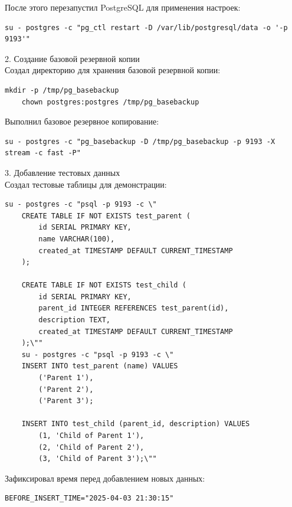 \documentclass{article}
\begin{document}
После этого перезапустил PostgreSQL для применения настроек:
\begin{lstlisting}[caption={kitty}, label={lst:example}]
    su - postgres -c "pg_ctl restart -D /var/lib/postgresql/data -o '-p 9193'"
\end{lstlisting}


2. Создание базовой резервной копии
\\
Создал директорию для хранения базовой резервной копии:

\begin{lstlisting}[caption={kitty}, label={lst:example}]
    mkdir -p /tmp/pg_basebackup
    chown postgres:postgres /tmp/pg_basebackup
\end{lstlisting}

Выполнил базовое резервное копирование:

\begin{lstlisting}[caption={kitty}, label={lst:example}]
    su - postgres -c "pg_basebackup -D /tmp/pg_basebackup -p 9193 -X stream -c fast -P"
\end{lstlisting}

3. Добавление тестовых данных
\\
Создал тестовые таблицы для демонстрации:

\begin{lstlisting}[caption={kitty}, label={lst:example}]
    su - postgres -c "psql -p 9193 -c \"
    CREATE TABLE IF NOT EXISTS test_parent (
        id SERIAL PRIMARY KEY,
        name VARCHAR(100),
        created_at TIMESTAMP DEFAULT CURRENT_TIMESTAMP
    );
    
    CREATE TABLE IF NOT EXISTS test_child (
        id SERIAL PRIMARY KEY,
        parent_id INTEGER REFERENCES test_parent(id),
        description TEXT,
        created_at TIMESTAMP DEFAULT CURRENT_TIMESTAMP
    );\""
    su - postgres -c "psql -p 9193 -c \"
    INSERT INTO test_parent (name) VALUES 
        ('Parent 1'),
        ('Parent 2'),
        ('Parent 3');
        
    INSERT INTO test_child (parent_id, description) VALUES 
        (1, 'Child of Parent 1'),
        (2, 'Child of Parent 2'),
        (3, 'Child of Parent 3');\""
\end{lstlisting}




Зафиксировал время перед добавлением новых данных:
\begin{lstlisting}[caption={kitty}, label={lst:example}]
    BEFORE_INSERT_TIME="2025-04-03 21:30:15"
\end{lstlisting}
\end{document}
